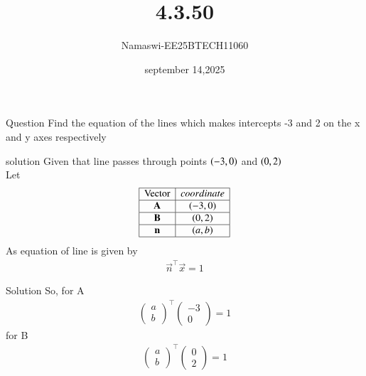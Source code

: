 \documentclass{beamer}
\begin{document}
\title 
{4.3.50}
\date{september 14,2025}


\author 
{Namaswi-EE25BTECH11060}
\frame{\titlepage}
\begin{frame}{Question}
Find the equation of the lines which makes intercepts -3 and 2 on the x and y axes respectively
\end{frame}
\begin{frame}{solution}
Given that line passes through points $\brak{-3,0}$ and $\brak{0,2}$ \\
Let
\[
\begin{array}{|c|c|}
\hline
\text{Vector} & coordinate \\ \hline
\vec{A} & (-3, 0) \\ \hline
\vec{B} & (0, 2) \\ \hline
\vec{n} & (a, b) \\ \hline
\end{array}
\]
As equation of line is given by 
\begin{align}
    \vec{n}^\top \vec{x}=1
\end{align}
\end{frame}
\begin{frame}{Solution}
   So, for A 
 \begin{align}
 \begin{pmatrix}
     a \\ b 
 \end{pmatrix}^\top\begin{pmatrix}
     -3  \\ 0
 \end{pmatrix}=1
  \end{align}
  for B
 \begin{align}
 \begin{pmatrix}
     a \\ b 
 \end{pmatrix}^\top\begin{pmatrix}
     0  \\  2
 \end{pmatrix}=1\\ 
\end{align}
\end{frame}
\end{document}
